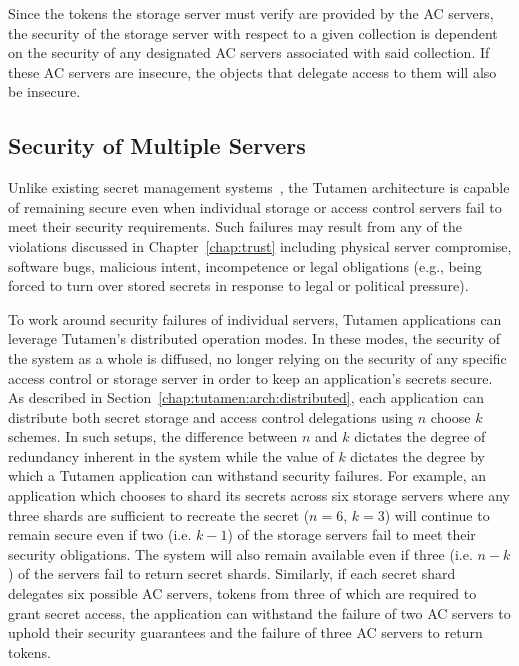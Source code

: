 Since the tokens the storage server must verify are provided by the AC
servers, the security of the storage server with respect to a given
collection is dependent on the security of any designated AC servers
associated with said collection. If these AC servers are insecure, the
objects that delegate access to them will also be insecure.

\subsection{Security of Multiple Servers}

Unlike existing secret management systems~\cite{vault, confidant,
  keywhiz}, the Tutamen architecture is capable of remaining secure
even when individual storage or access control servers fail to meet
their security requirements. Such failures may result from any of the
violations discussed in Chapter~\ref{chap:trust} including physical
server compromise, software bugs, malicious intent, incompetence or
legal obligations (e.g., being forced to turn over stored secrets in
response to legal or political pressure).

To work around security failures of individual servers, Tutamen
applications can leverage Tutamen's distributed operation modes. In
these modes, the security of the system as a whole is diffused, no
longer relying on the security of any specific access control or
storage server in order to keep an application's secrets secure. As
described in Section~\ref{chap:tutamen:arch:distributed}, each
application can distribute both secret storage and access control
delegations using $n$ choose $k$ schemes. In such setups, the
difference between $n$ and $k$ dictates the degree of redundancy
inherent in the system while the value of $k$ dictates the degree by
which a Tutamen application can withstand security failures. For
example, an application which chooses to shard its secrets across six
storage servers where any three shards are sufficient to recreate the
secret ($n=6$, $k=3$) will continue to remain secure even if two
(i.e. $k-1$) of the storage servers fail to meet their security
obligations. The system will also remain available even if three
(i.e. $n-k$) of the servers fail to return secret shards. Similarly,
if each secret shard delegates six possible AC servers, tokens from
three of which are required to grant secret access, the application
can withstand the failure of two AC servers to uphold their security
guarantees and the failure of three AC servers to return tokens.


